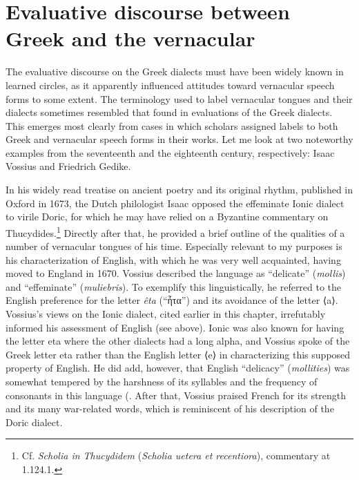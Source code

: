 \section{Evaluative discourse between Greek and the vernacular}\label{sec:7.3}


The evaluative discourse on the Greek dialects must have been widely known in learned circles, as it apparently influenced attitudes toward vernacular speech forms to some extent. The terminology used to label vernacular tongues and their dialects sometimes resembled that found in evaluations of the Greek dialects. This emerges most clearly from cases in which scholars assigned labels to both Greek and vernacular speech forms in their works. Let me look at two noteworthy examples from the seventeenth and the eighteenth century, respectively: Isaac Vossius and Friedrich Gedike.

In his widely read treatise on ancient poetry and its original rhythm, published in Oxford in 1673, the Dutch philologist Isaac \citet[54--55]{Vossius1673} opposed the effeminate Ionic dialect to virile Doric, for which he may have relied on a Byzantine commentary on Thucydides.\footnote{Cf. \textit{Scholia in Thucydidem} (\textit{Scholia uetera et recentiora}), commentary at 1.124.1.} Directly after that, he provided a brief outline of the qualities of a number of vernacular tongues of his time. Especially relevant to my purposes is his characterization of English, with which he was very well acquainted, having moved to England in 1670. Vossius described the language as “delicate” (\textit{mollis}) and “effeminate” (\textit{muliebris}). To exemplify this linguistically, he referred to the English preference for the letter \textit{êta} (“ἦτα”) and its avoidance of the letter ⟨a⟩. Vossius’s views on the Ionic dialect, cited earlier in this chapter, irrefutably informed his assessment of English (see  above). Ionic was also known for having the letter eta where the other dialects had a long alpha, and Vossius spoke of the Greek letter eta rather than the English letter ⟨e⟩ in characterizing this supposed property of English. He did add, however, that English “delicacy” (\textit{mollities}) was somewhat tempered by the harshness of its syllables and the frequency of consonants in this language (\citet[56]{Vossius1673}. After that, Vossius praised French for its strength and its many war-related words, which is reminiscent of his description of the Doric dialect.


